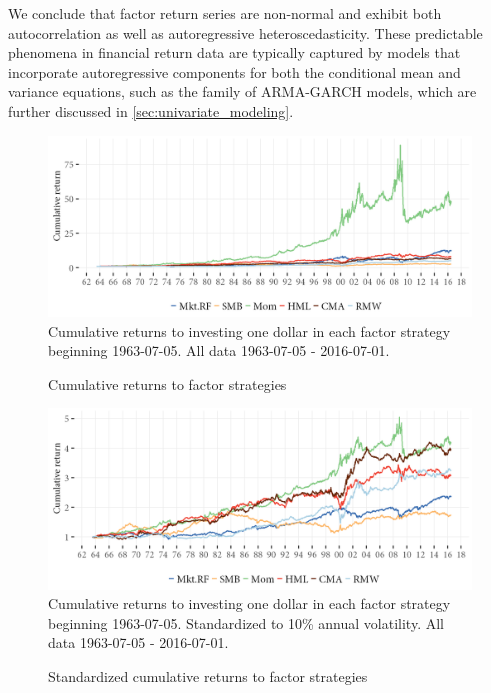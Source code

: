 We conclude that factor return series are non-normal and exhibit both autocorrelation as well as autoregressive heteroscedasticity. These predictable phenomena in financial return data are typically captured by models that incorporate autoregressive components for both the conditional mean and variance equations, such as the family of ARMA-GARCH models, which are further discussed in \autoref{sec:univariate_modeling}.
\begin{figure}[htbp]
  \caption{Cumulative returns to factor strategies}
  \label{fig:cumret}
  \centering
  \begin{minipage}{\textwidth}
  \includegraphics[scale=1]{graphics/cumretPlot.png}  
  \vspace{3mm}
  \footnotesize
  Cumulative returns to investing one dollar in each factor strategy beginning 1963-07-05.  All data 1963-07-05 - 2016-07-01.
  \end{minipage}
\end{figure}
\begin{figure}[htbp]
  \caption{Standardized cumulative returns to factor strategies}
  \label{fig:cumretstd}
  \centering
  \begin{minipage}{\textwidth}
  \includegraphics[scale=1]{graphics/cumretStdPlot.png}  
  \vspace{3mm}
  \footnotesize
  Cumulative returns to investing one dollar in each factor strategy beginning 1963-07-05. Standardized to 10\% annual volatility. All data 1963-07-05 - 2016-07-01.
  \end{minipage}
\end{figure}

